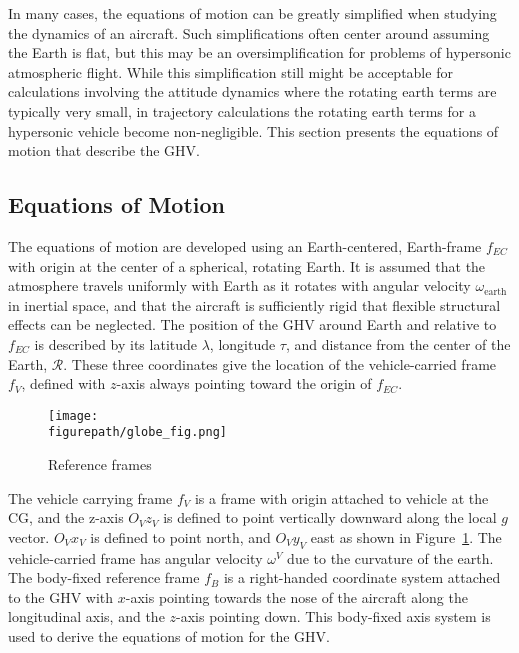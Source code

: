 In many cases, the equations of motion can be greatly simplified when studying the dynamics of an aircraft.
Such simplifications often center around assuming the Earth is flat, but this may be an oversimplification for problems of hypersonic atmospheric flight.
While this simplification still might be acceptable for calculations involving the attitude dynamics where the rotating earth terms are typically very small, in trajectory calculations the rotating earth terms for a hypersonic vehicle become non-negligible.
This section presents the equations of motion that describe the GHV.\@

\subsection{Equations of Motion}

The equations of motion are developed using an Earth-centered, Earth-frame $f_{EC}$ with origin at the center of a spherical, rotating Earth.
It is assumed that the atmosphere travels uniformly with Earth as it rotates with angular velocity $\omega_{\text{earth}}$ in inertial space, and that the aircraft is sufficiently rigid that flexible structural effects can be neglected.
The position of the GHV around Earth and relative to $f_{EC}$ is described by its latitude $\lambda$, longitude $\tau$, and distance from the center of the Earth, $\mathscr{R}$.
These three coordinates give the location of the vehicle-carried frame $f_{V}$, defined with $z$-axis always pointing toward the origin of $f_{EC}$.

\begin{figure}[H]
  \begin{center}
    \texttt{[image: \\figurepath/globe\_fig.png]}
    \caption{Reference frames\ \cite{etkin.atmosphericflight.1972}\label{globe_fig}}
  \end{center}
\end{figure}

The vehicle carrying frame $f_{V}$ is a frame with origin attached to vehicle at the CG, and the z-axis $O_{V}z_{V}$ is defined to point vertically downward along the local $g$ vector.
$O_{V}x_{V}$ is defined to point north, and $O_{V}y_{V}$ east as shown in Figure~\ref{globe_fig}.
The vehicle-carried frame has angular velocity $\omega^{V}$ due to the curvature of the earth.
The body-fixed reference frame $f_{B}$ is a right-handed coordinate system attached to the GHV with $x$-axis pointing towards the nose of the aircraft along the longitudinal axis, and the $z$-axis pointing down.
This body-fixed axis system is used to derive the equations of motion for the GHV.\@

